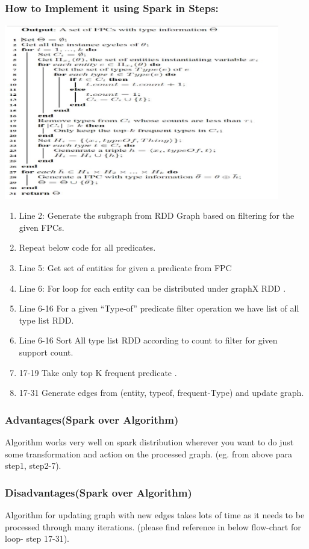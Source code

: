 \documentclass{easychair}
\begin{document}
\subsubsection{How to Implement it using Spark in Steps: }
\includegraphics[width=0.9\textwidth]{akhilesh_algo.png}
\begin{enumerate}
\item Line 2: Generate the subgraph  from RDD Graph based on filtering for the given FPCs. 
\item Repeat below code for all predicates.
\item Line 5: Get set of entities for given a predicate from FPC
\item Line 6: For loop for each entity can be distributed under graphX RDD .
\item Line 6-16 For a given “Type-of” predicate filter operation we have list of all type list RDD.
\item Line 6-16 Sort All type list RDD according to count to filter for given support count.
\item 17-19 Take only top K frequent predicate .
\item 17-31 Generate edges from  (entity, typeof, frequent-Type) and update graph.

\end{enumerate}

\subsubsection{Advantages(Spark over Algorithm)}
Algorithm works very well on spark distribution wherever you want to do just some transformation and action on the processed graph. (eg. from above para step1, step2-7).

\subsubsection{Disadvantages(Spark over Algorithm)}
Algorithm for updating graph with new edges takes lots of time as it needs to be processed through many iterations. (please find reference in below flow-chart for loop- step 17-31).
\end{document}
